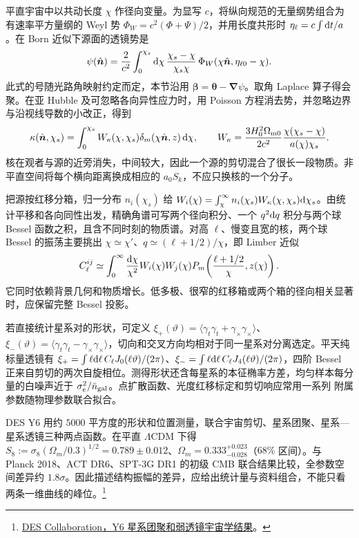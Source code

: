 平直宇宙中以共动长度 $\chi$ 作径向变量。为显写 $c$，将纵向规范的无量纲势组合为有速率平方量纲的 Weyl 势 $\Phi_W=c^2(\Phi+\Psi)/2$，并用长度共形时 $\eta_\ell=c\int\dd t/a$。在 Born 近似下源面的透镜势是
\[
 \psi(\hat{\bm n})=\frac{2}{c^2}
      \int_0^{\chi_s}\dd\chi\,
            \frac{\chi_s-\chi}{\chi_s\chi}\,
                   \Phi_W(\chi\hat{\bm n},\eta_{\ell0}-\chi).
\]
此式的号随光路角映射约定而定，本节沿用 $\bm\beta=\bm\theta-\bm\nabla\psi$。取角 Laplace 算子得会聚。在亚 Hubble 及可忽略各向异性应力时，用 Poisson 方程消去势，并忽略边界与沿视线导数的小改正，得到
\begin{equation}\label{eq:cosmo-lenskernel}
 \kappa(\hat{\bm n},\chi_s)=\int_0^{\chi_s}W_\kappa(\chi,\chi_s)
                \delta_m(\chi\hat{\bm n},z)\,\dd\chi,\qquad
 W_\kappa=\frac{3H_0^2\Omega_{\rm m0}}{2c^2}
       \frac{\chi(\chi_s-\chi)}{a(\chi)\chi_s}.
\end{equation}
核在观者与源的近旁消失，中间较大，因此一个源的剪切混合了很长一段物质。非平直空间将每个横向距离换成相应的 $a_0S_k$，不应只换核的一个分子。

把源按红移分箱，归一分布 $n_i(\chi_s)$ 给 $W_i(\chi)=\int_\chi^\infty n_i(\chi_s)W_\kappa(\chi,\chi_s)\dd\chi_s$。由统计平移和各向同性出发，精确角谱可写两个径向积分、一个 $q^2\dd q$ 积分与两个球 Bessel 函数之积，且含不同时刻的物质谱。对高 $\ell$、慢变且宽的核，两个球 Bessel 的振荡主要挑出 $\chi\simeq\chi'$、$q\simeq(\ell+1/2)/\chi$，即 Limber 近似
\begin{equation}\label{eq:cosmo-shear-spectrum}
 C_\ell^{ij}\simeq\int_0^\infty\frac{\dd\chi}{\chi^2}
       W_i(\chi)W_j(\chi)
       P_m\!\left(\frac{\ell+1/2}{\chi},z(\chi)\right).
\end{equation}
它同时依赖背景几何和物质增长。低多极、很窄的红移箱或两个箱的径向相关显著时，应保留完整 Bessel 投影。

若直接统计星系对的形状，可定义 $\xi_+(\vartheta)=\langle\gamma_t\gamma_t+\gamma_\times\gamma_\times\rangle$、$\xi_-(\vartheta)=\langle\gamma_t\gamma_t-\gamma_\times\gamma_\times\rangle$，切向和交叉方向均相对于同一星系对分离选定。平天纯标量透镜有 $\xi_+=\int\ell\dd\ell\,C_\ell J_0(\ell\vartheta)/(2\pi)$、$\xi_-=\int\ell\dd\ell\,C_\ell J_4(\ell\vartheta)/(2\pi)$，四阶 Bessel 正来自剪切的两次自旋相位。测得形状还含每星系的本征椭率方差，均匀样本每分量的白噪声近于 $\sigma_e^2/\bar n_{\rm gal}$。点扩散函数、光度红移标定和剪切响应常用一系列 附属参数随物理参数联合拟合。

DES Y6 用约 $5000$ 平方度的形状和位置测量，联合宇宙剪切、星系团聚、星系—星系透镜三种两点函数。在平直 $\Lambda$CDM 下得 $S_8:=\sigma_8(\Omega_m/0.3)^{1/2}=0.789\pm0.012$、$\Omega_m=0.333^{+0.023}_{-0.028}$（$68\%$ 区间）。与 Planck 2018、ACT DR6、SPT-3G DR1 的初级 CMB 联合结果比较，全参数空间差异约 $1.8\sigma$。因此描述结构振幅的差异，应给出统计量与资料组合，不能只看两条一维曲线的峰位。\footnote{\href{https://arxiv.org/abs/2601.14559}{DES Collaboration，Y6 星系团聚和弱透镜宇宙学结果}。}

